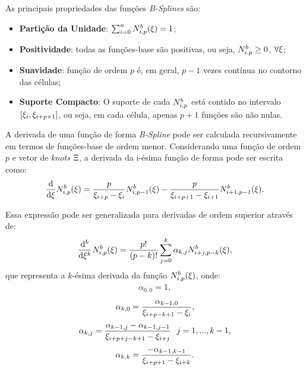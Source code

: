 As principais propriedades das funções \textit{B-Splines} são:
\begin{itemize}
	\item \textbf{Partição da Unidade}: $\sum_{i=0}^{n}N^b_{i,p}(\xi)=1 $;
	\item \textbf{Positividade}: todas as funções-base são positivas, ou seja, $N^b_{i,p}\geq0$, $\forall\xi$;
	\item \textbf{Suavidade}: função de ordem $p$ é, em geral, $p-1$ vezes contínua no contorno das células;
	\item \textbf{Suporte Compacto}: O suporte de cada $N^b_{i,p}$ está contido no intervalo $\left[\xi_i,\xi_{i+p+1}\right]$, ou seja, em cada célula, apenas $p+1$ funções são não nulas. %
\end{itemize}

A derivada de uma função de forma \textit{B-Spline} pode ser calculada recursivamente em termos de funções-base de ordem menor. Considerando uma função de ordem $p$ e vetor de \textit{knots} $\Xi$, a derivada da i-ésima função de forma pode ser escrita como:
\begin{align}
\frac{\mathrm{d}}{\mathrm{d} \xi} N^b_{i,p}(\xi) = \frac{p}{\xi_{i+p} - \xi_{i}}N^b_{i,p-1}(\xi) - \frac{p}{\xi_{i+p+1} - \xi_{i+1}}N^b_{i+1,p-1}(\xi).
\end{align}

Essa expressão pode ser generalizada para derivadas de ordem superior através de:
\begin{align}
	\frac{\mathrm{d}^{k}}{\mathrm{d} \xi^{k}} N^b_{i,p}(\xi) = \frac{p!}{\left(p-k\right)!} \sum_{j=0}^{k}{\alpha_{k,j}N^b_{i+j,p-k}(\xi)},
\end{align}
\noindent que representa a $k$-ésima derivada da função $N^b_{i,p}(\xi)$, onde:
\begin{align}
	\alpha_{0,0} = 1,
\end{align}
\begin{align}
	\alpha_{k,0} = \frac{\alpha_{k-1,0}}{\xi_{i+p-k+1}-\xi_{i}},
\end{align}
\begin{align}
	\alpha_{k,j} = \frac{\alpha_{k-1,j}-\alpha_{k-1,j-1}}{\xsi_{i+p+j-k+1}-\xsi_{i+j}} \ \ j=1,...,k-1,
\end{align}
\begin{align}
	\alpha_{k,k} = \frac{-\alpha_{k-1,k-1}}{\xi_{i+p+1}-\xi_{i+k}}.
\end{align}

